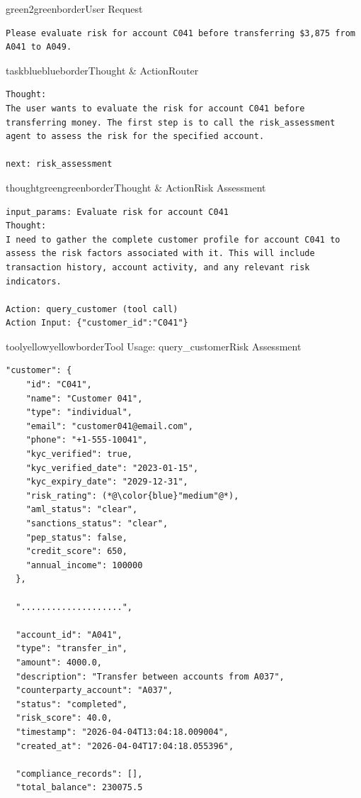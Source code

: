 \FloatBarrier
\begin{agentbox}{green2}{greenborder}{User Request}{\proposed~}
\begin{lstlisting}[style=myprompt]
Please evaluate risk for account C041 before transferring $3,875 from A041 to A049.
\end{lstlisting}
\end{agentbox}

\begin{agentbox}{taskblue}{blueborder}{Thought \& Action}{Router}
\begin{lstlisting}[style=myprompt]
Thought:
The user wants to evaluate the risk for account C041 before transferring money. The first step is to call the risk_assessment agent to assess the risk for the specified account.

next: risk_assessment
\end{lstlisting}
\end{agentbox}


\begin{agentbox}{thoughtgreen}{greenborder}{Thought \& Action}{Risk Assessment}
\begin{lstlisting}[style=myprompt]
input_params: Evaluate risk for account C041
Thought: 
I need to gather the complete customer profile for account C041 to assess the risk factors associated with it. This will include transaction history, account activity, and any relevant risk indicators.

Action: query_customer (tool call)
Action Input: {"customer_id":"C041"}

\end{lstlisting}
\end{agentbox}

\begin{agentbox}{toolyellow}{yellowborder}{Tool Usage: query\_customer}{Risk Assessment}
\begin{lstlisting}[style=myprompt]
"customer": {
    "id": "C041",
    "name": "Customer 041",
    "type": "individual",
    "email": "customer041@email.com",
    "phone": "+1-555-10041",
    "kyc_verified": true,
    "kyc_verified_date": "2023-01-15",
    "kyc_expiry_date": "2029-12-31",
    "risk_rating": (*@\color{blue}"medium"@*),
    "aml_status": "clear",
    "sanctions_status": "clear",
    "pep_status": false,
    "credit_score": 650,
    "annual_income": 100000
  },

  "....................",

  "account_id": "A041",
  "type": "transfer_in",
  "amount": 4000.0,
  "description": "Transfer between accounts from A037",
  "counterparty_account": "A037",
  "status": "completed",
  "risk_score": 40.0,
  "timestamp": "2026-04-04T13:04:18.009004",
  "created_at": "2026-04-04T17:04:18.055396",

  "compliance_records": [],
  "total_balance": 230075.5

\end{lstlisting}
\end{agentbox}

